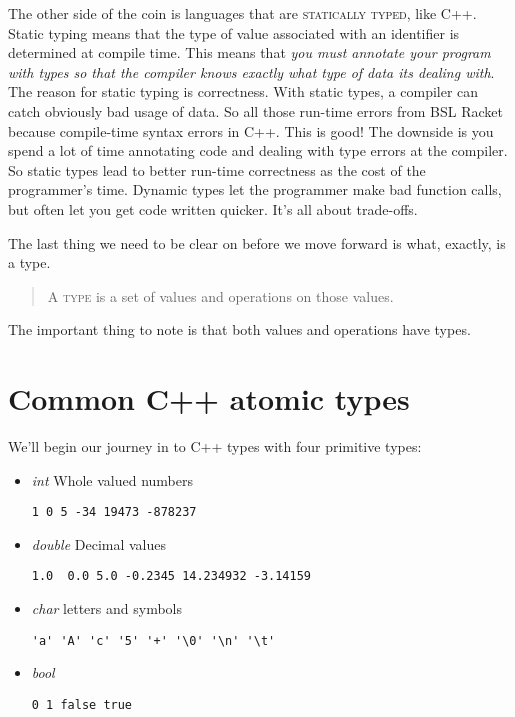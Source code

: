 \documentclass[]{tufte-handout}
\begin{document}
The other side of the coin is languages that are \textsc{statically typed}, like C++.  Static typing means that the type of value associated with an identifier is determined at compile time.  This means that \textit{you must annotate your program with types so that the compiler knows exactly what type of data its dealing with}. The reason for static typing is correctness.  With static types, a compiler can catch obviously bad usage of data. So all those run-time errors from BSL Racket because compile-time syntax errors in C++.  This is good! The downside is you spend a lot of time annotating code and dealing with type errors at the compiler. So static types lead to better run-time correctness as the cost of the programmer's time. Dynamic types let the programmer make bad function calls, but often let you get code written quicker. It's all about trade-offs.   

The last thing we need to be clear on before we move forward is what, exactly, is a type.  
\begin{quote}
A \textsc{type} is a set of values and operations on those values.  
\end{quote}
The important thing to note is that both values and operations have types. 

\section{Common C++ atomic types}

We'll begin our journey in to C++ types with four primitive types:
\begin{itemize}
\item \textit{int} Whole valued numbers
\begin{verbatim}
1 0 5 -34 19473 -878237
\end{verbatim}
\item \textit{double} Decimal values
\begin{verbatim}
1.0  0.0 5.0 -0.2345 14.234932 -3.14159
\end{verbatim}
\item \textit{char} letters and symbols
\begin{verbatim}
'a' 'A' 'c' '5' '+' '\0' '\n' '\t'
\end{verbatim}
\item \textit{bool}
\begin{verbatim}
0 1 false true
\end{verbatim}
\end{itemize}
\end{document}
